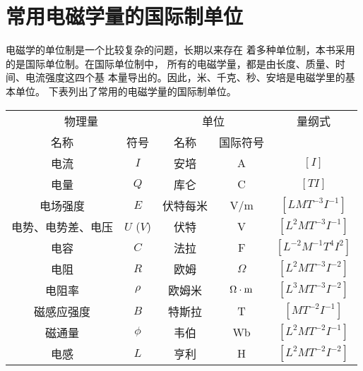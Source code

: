 \chapter{常用电磁学量的国际制单位}

电磁学的单位制是一个比较复杂的问题，长期以来存在
着多种单位制，本书采用的是国际单位制。在国际单位制中，
所有的电磁学量，都是由长度、质量、时间、电流强度这四个基
本量导出的。因此，米、千克、秒、安培是电磁学里的基本单位。
下表列出了常用的电磁学量的国际制单位。

\begin{center}
    \begin{tabular}{cc|cc|c}
  \hline
\multicolumn{2}{c|}{物理量} & \multicolumn{2}{c|}{单位} & 量纲式\\
名称 & 符号 & 名称 & 国际符号 \\
  \hline
电流   &  $I$ & 安培 & A & $[I]$\\
电量    &  $Q$  &  库仑  & C   & $[TI]$   \\
电场强度    &$E$    &  伏特每米  & V/m   &  $[LMT^{-3}I^{-1}]$  \\
电势、电势差、电压& $U$ ($V$)   &  伏特  &  V  &  $[L^2MT^{-3}I^{-1}]$  \\
电容    &  $C$  &  法拉  & F   &  $[L^{-2}M^{-1}T^{4}I^{2}]$   \\
电阻    & $R$  & 欧姆  &  $\Omega$ & $[L^2MT^{-3}I^{-2}]$  \\
电阻率    & $\rho$  & 欧姆米  &  $\Omega\cdot {\rm m}$ & $[L^3MT^{-3}I^{-2}]$  \\
磁感应强度    & $B$  & 特斯拉  & T  &  $[MT^{-2}I^{-1}]$ \\
磁通量    & $\phi$  & 韦伯  & Wb  & $[L^2MT^{-2}I^{-1}]$  \\
电感    & $L$  & 亨利  & H  &  $[L^2MT^{-2}I^{-2}]$ \\
  \hline      
    \end{tabular}
\end{center}

